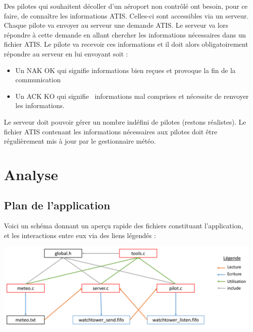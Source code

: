\documentclass{report}
\begin{document}
		Des pilotes qui souhaitent décoller d’un aéroport non contrôlé ont besoin, pour ce faire, de connaître les informations ATIS. Celles-ci sont accessibles via un serveur.
		Chaque pilote va envoyer au serveur une demande ATIS. Le serveur va lors répondre à cette demande en allant chercher les informations nécessaires dans un fichier ATIS.
		Le pilote va recevoir ces informations et il doit alors obligatoirement répondre au serveur en lui envoyant soit :\newline
		\begin{itemize}
			\item Un NAK OK qui signifie \og informations bien reçues \fg et provoque la fin de la communication
			\item Un ACK KO qui signifie \og informations mal comprises \fg et nécessite de renvoyer les informations.
		\end{itemize}

		Le serveur doit pouvoir gérer un nombre indéfini de pilotes (restons réalistes).
		Le fichier ATIS contenant les informations nécessaires aux pilotes doit être régulièrement mis à jour par le gestionnaire météo.

\chapter{Analyse}
 \section{Plan de l'application}
 	Voici un schéma donnant un aperçu rapide des fichiers constituant l'application, et les interactions entre eux via des liens légendés : \newline

	\includegraphics[width=\linewidth, frame]{schemasProjet.png} \newline
\end{document}
